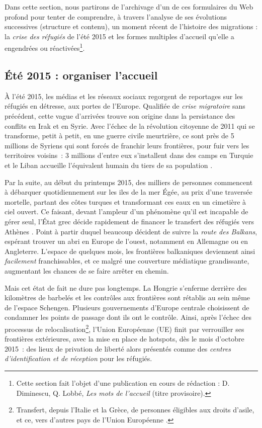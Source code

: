 \documentclass[symmetric,justified,marginals=raggedouter]{tufte-book}
\begin{document}
Dans cette section, nous partirons de l'archivage d'un de ces formulaires du Web profond pour tenter de comprendre, à travers l'analyse de ses évolutions successives (structure et contenu), un moment récent de l'histoire des migrations : la \textit{crise des réfugiés} de l'été 2015 et les formes multiples d'accueil qu'elle a engendrées ou réactivées\footnote{\RaggedOuter Cette section fait l'objet d'une publication en cours de rédaction : D. Diminescu, Q. Lobbé, \textit{Les mots de l'accueil} (titre provisoire).}.

\subsection{Été 2015 : organiser l'accueil}

\noindent À l'été 2015, les médias et les réseaux sociaux regorgent de reportages sur les réfugiés en détresse, aux portes de l’Europe. Qualifiée de \textit{crise migratoire} sans précédent, cette vague d'arrivées trouve son origine dans la persistance des conflits en Irak et en Syrie. Avec l'échec de la révolution citoyenne de 2011 qui se transforme, petit à petit, en une guerre civile meurtrière, ce sont près de 5 millions de Syriens qui sont forcés de franchir leurs frontières, pour fuir vers les territoires voisins~: 3 millions d'entre eux s'installent dans des camps en Turquie et le Liban accueille l'équivalent humain du tiers de sa population \citep{blanchard_crise_2016}.   

Par la suite, au début du printemps 2015, des milliers de personnes commencent à débarquer quotidiennement sur les iles de la mer Égée, au prix d'une traversée mortelle, partant des côtes turques et transformant ces eaux en un cimetière à ciel ouvert. Ce faisant, devant l'ampleur d'un phénomène qu'il est incapable de gérer seul, l'État grec décide rapidement de financer le transfert des réfugiés vers Athènes \citep{pillant_en_2016}. Point à partir duquel beaucoup décident de suivre la \textit{route des Balkans}, espérant trouver un abri en Europe de l'ouest, notamment en Allemagne ou en Angleterre. L'espace de quelques mois, les frontières balkaniques deviennent ainsi \textit{facilement} franchissables, et ce malgré une couverture médiatique grandissante, augmentant les chances de se faire arrêter en chemin. 

Mais cet état de fait ne dure pas longtemps. La Hongrie s'enferme derrière des kilomètres de barbelés et les contrôles aux frontières sont rétablis au sein même de l'espace Schengen. Plusieurs gouvernements d'Europe centrale choisissent de condamner les points de passage dont ils ont le contrôle. Ainsi, après l'échec des processus de relocalisation\footnote{\RaggedOuter Transfert, depuis l'Italie et la Grèce, de personnes éligibles aux droits d'asile, et ce, vers d'autres pays de l'Union Européenne \citep{tervonen_finlande:_2016}.}, l'Union Européenne (UE) finit par verrouiller ses frontières extérieures, avec la mise en place de hotspots, dès le mois d'octobre 2015~: des lieux de privation de liberté alors présentés comme des \textit{centres d'identification et de réception} pour les réfugiés.   
\end{document}
